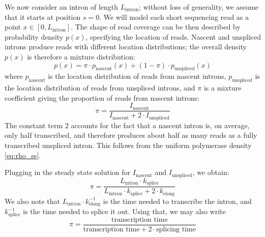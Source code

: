 \documentclass[11pt]{article}
\begin{document}
    We now consider an intron of length $L_{\mathrm{intron}}$; without loss of generality, we assume that it starts at position $s=0$. We will model each short sequencing read as a point $x \in \left[0, L_{\mathrm{intron}} \right]$. The shape of read coverage can be then described by probability density $p(x)$, specifying the location of reads. Nascent and unspliced introns produce reads with different location distributions; the overall density $p(x)$ is therefore a mixture distribution:
    \begin{equation} \label{eq:mixture}
    p(x) = \pi \cdot p_{\mathrm{nascent}} (x) + (1-\pi) \cdot p_{\mathrm{unspliced}}(x)
    \end{equation}
    where $p_{\mathrm{nascent}}$ is the location distribution of reads from nascent introns, $p_{\mathrm{unspliced}}$ is the location distribution of reads from unspliced introns, and $\pi$ is a mixture coefficient giving the proportion of reads from nascent introns:
    \begin{equation} \label{eq:pi_counts}
    \pi = \frac{I_{\mathrm{nascent}}}{I_{\mathrm{nascent}} + 2 \cdot I_{\mathrm{unspliced}}}
    \end{equation}
    The constant term $2$ accounts for the fact that a nascent intron is, on average, only half transcribed, and therefore produces about half as many reads as a fully transcribed unspliced intron. This follows from the uniform polymerase density \eqref{eq:rho_ss}.

    Plugging in the steady state solution for $I_{\mathrm{nascent}}$ and $I_{\mathrm{unspliced}}$, we obtain:
    \begin{equation} \label{eq:pi_rates}
    \pi = \frac{{L_{\mathrm{intron}} \cdot k_\mathrm{splice}}}{L_{\mathrm{intron}} \cdot k_\mathrm{splice} + 2 \cdot k_\mathrm{elong}}
    \end{equation}
    We also note that $L_{\mathrm{intron}} \cdot k_\mathrm{elong}^{-1}$ is the time needed to transcribe the intron, and $k_\mathrm{splice}^{-1}$ is the time needed to splice it out. Using that, we may also write
    \begin{equation} \label{eq:pi_times}
    \pi = \frac{\text{transcription time}}{\text{transcription time} + 2 \cdot \text{splicing time}}
    \end{equation}
\end{document}
